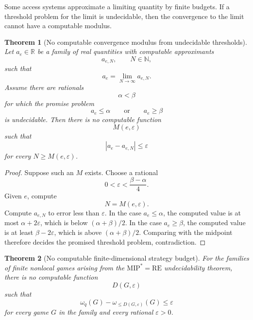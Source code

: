 \documentclass[11pt]{article}
\newtheorem{theorem}{Theorem}[section]
\begin{document}
Some access systems approximate a limiting quantity by finite budgets. If a threshold problem for the limit is undecidable, then the convergence to the limit cannot have a computable modulus.

\begin{theorem}[No computable convergence modulus from undecidable thresholds]
Let \(a_e\in\mathbb R\) be a family of real quantities with computable approximants
\[
a_{e,N},\qquad N\in\mathbb N,
\]
such that
\[
a_e=\lim_{N\to\infty}a_{e,N}.
\]
Assume there are rationals
\[
\alpha<\beta
\]
for which the promise problem
\[
a_e\leq\alpha
\qquad\text{or}\qquad
a_e\geq\beta
\]
is undecidable. Then there is no computable function
\[
M(e,\varepsilon)
\]
such that
\[
|a_e-a_{e,N}|\leq\varepsilon
\]
for every \(N\geq M(e,\varepsilon)\).
\end{theorem}

\begin{proof}
Suppose such an \(M\) exists. Choose a rational
\[
0<\varepsilon<\frac{\beta-\alpha}{4}.
\]
Given \(e\), compute
\[
N=M(e,\varepsilon).
\]
Compute \(a_{e,N}\) to error less than \(\varepsilon\). In the case \(a_e\leq\alpha\), the computed value is at most \(\alpha+2\varepsilon\), which is below \((\alpha+\beta)/2\). In the case \(a_e\geq\beta\), the computed value is at least \(\beta-2\varepsilon\), which is above \((\alpha+\beta)/2\). Comparing with the midpoint therefore decides the promised threshold problem, contradiction.
\end{proof}

\begin{theorem}[No computable finite-dimensional strategy budget]
For the families of finite nonlocal games arising from the \( \mathrm{MIP}^{\ast}=\mathrm{RE}\) undecidability theorem, there is no computable function
\[
D(G,\varepsilon)
\]
such that
\[
\omega_q(G)-\omega_{\leq D(G,\varepsilon)}(G)\leq\varepsilon
\]
for every game \(G\) in the family and every rational \(\varepsilon>0\).
\end{theorem}
\end{document}
